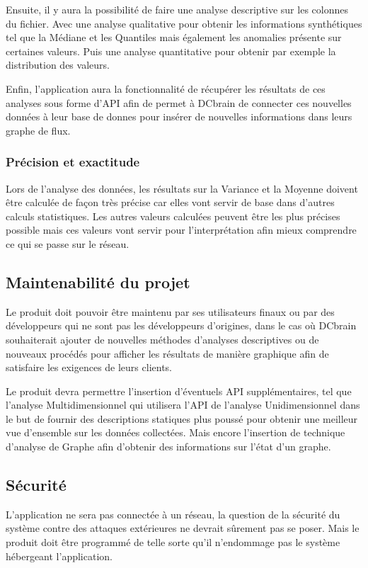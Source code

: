 			Ensuite, il y aura la possibilité de faire une analyse descriptive sur les colonnes du fichier. Avec une analyse qualitative pour obtenir les informations synthétiques tel que la Médiane et les Quantiles mais également les anomalies présente sur certaines valeurs. Puis une analyse quantitative pour obtenir par exemple la distribution des valeurs.\newline

			Enfin, l’application aura la fonctionnalité de récupérer les résultats de ces analyses sous forme d’API afin de permet à DCbrain de connecter ces nouvelles données à leur base de donnes pour insérer de nouvelles informations dans leurs graphe de flux.

			\subsubsection{Précision et exactitude}
			Lors de l'analyse des données, les résultats sur la Variance et la Moyenne doivent être calculée de façon très précise car elles vont servir de base dans d’autres calculs statistiques. Les autres valeurs calculées peuvent être les plus précises possible mais ces valeurs vont servir pour l'interprétation afin mieux comprendre ce qui se passe sur le réseau.

		\subsection{Maintenabilité du projet}
		Le produit doit pouvoir être maintenu par ses utilisateurs finaux ou par des développeurs qui ne sont pas les développeurs d’origines, dans le cas où DCbrain souhaiterait ajouter de nouvelles méthodes d’analyses descriptives ou de nouveaux procédés pour afficher les résultats de manière graphique afin de satisfaire les exigences de leurs clients.\newline
		
		Le produit devra permettre l'insertion d'éventuels API supplémentaires, tel que l'analyse Multidimensionnel qui utilisera l'API de l'analyse Unidimensionnel dans le but de fournir des descriptions statiques plus poussé pour obtenir une meilleur vue d'ensemble sur les données collectées. Mais encore l'insertion de technique d'analyse de Graphe afin d'obtenir des informations sur l'état d'un graphe.
		
		\subsection{Sécurité}
		L’application ne sera pas connectée à un réseau, la question de la sécurité du système contre des attaques extérieures ne devrait sûrement pas se poser. Mais le produit doit être programmé de telle sorte qu’il n’endommage pas le système hébergeant l’application.
		
